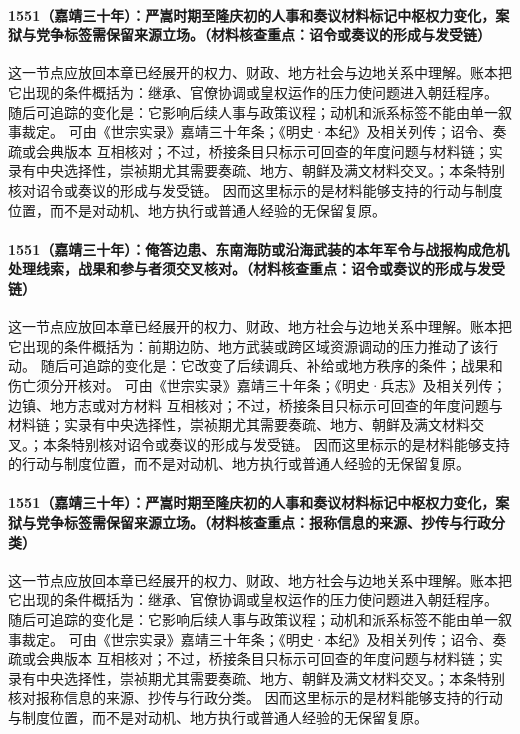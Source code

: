 \paragraph{1551（嘉靖三十年）：严嵩时期至隆庆初的人事和奏议材料标记中枢权力变化，案狱与党争标签需保留来源立场。（材料核查重点：诏令或奏议的形成与发受链）} 这一节点应放回本章已经展开的权力、财政、地方社会与边地关系中理解。账本把它出现的条件概括为：继承、官僚协调或皇权运作的压力使问题进入朝廷程序。 随后可追踪的变化是：它影响后续人事与政策议程；动机和派系标签不能由单一叙事裁定。 可由《世宗实录》嘉靖三十年条；《明史·本纪》及相关列传；诏令、奏疏或会典版本 互相核对；不过，桥接条目只标示可回查的年度问题与材料链；实录有中央选择性，崇祯期尤其需要奏疏、地方、朝鲜及满文材料交叉。；本条特别核对诏令或奏议的形成与发受链。 因而这里标示的是材料能够支持的行动与制度位置，而不是对动机、地方执行或普通人经验的无保留复原。

\paragraph{1551（嘉靖三十年）：俺答边患、东南海防或沿海武装的本年军令与战报构成危机处理线索，战果和参与者须交叉核对。（材料核查重点：诏令或奏议的形成与发受链）} 这一节点应放回本章已经展开的权力、财政、地方社会与边地关系中理解。账本把它出现的条件概括为：前期边防、地方武装或跨区域资源调动的压力推动了该行动。 随后可追踪的变化是：它改变了后续调兵、补给或地方秩序的条件；战果和伤亡须分开核对。 可由《世宗实录》嘉靖三十年条；《明史·兵志》及相关列传；边镇、地方志或对方材料 互相核对；不过，桥接条目只标示可回查的年度问题与材料链；实录有中央选择性，崇祯期尤其需要奏疏、地方、朝鲜及满文材料交叉。；本条特别核对诏令或奏议的形成与发受链。 因而这里标示的是材料能够支持的行动与制度位置，而不是对动机、地方执行或普通人经验的无保留复原。

\paragraph{1551（嘉靖三十年）：严嵩时期至隆庆初的人事和奏议材料标记中枢权力变化，案狱与党争标签需保留来源立场。（材料核查重点：报称信息的来源、抄传与行政分类）} 这一节点应放回本章已经展开的权力、财政、地方社会与边地关系中理解。账本把它出现的条件概括为：继承、官僚协调或皇权运作的压力使问题进入朝廷程序。 随后可追踪的变化是：它影响后续人事与政策议程；动机和派系标签不能由单一叙事裁定。 可由《世宗实录》嘉靖三十年条；《明史·本纪》及相关列传；诏令、奏疏或会典版本 互相核对；不过，桥接条目只标示可回查的年度问题与材料链；实录有中央选择性，崇祯期尤其需要奏疏、地方、朝鲜及满文材料交叉。；本条特别核对报称信息的来源、抄传与行政分类。 因而这里标示的是材料能够支持的行动与制度位置，而不是对动机、地方执行或普通人经验的无保留复原。

